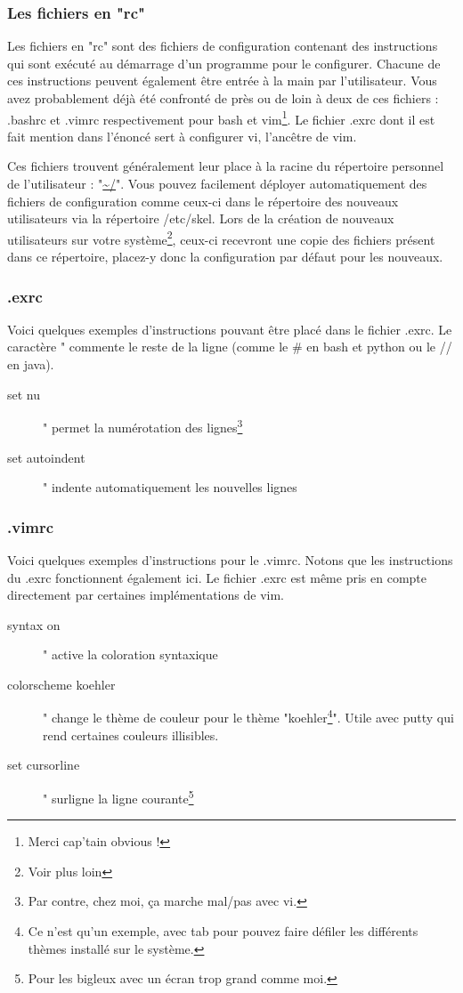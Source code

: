 \documentclass[a4paper,11pt]{article}
\begin{document}
\subsubsection{Les fichiers en "rc"}
\par Les fichiers en "rc" sont des fichiers de configuration contenant des instructions qui sont exécuté au démarrage d'un programme pour le configurer. Chacune de ces instructions peuvent également être entrée à la main par l'utilisateur. Vous avez probablement déjà été confronté de près ou de loin à deux de ces fichiers : .bashrc et .vimrc respectivement pour bash et vim\footnote{Merci cap'tain obvious !}. Le fichier .exrc dont il est fait mention dans l'énoncé sert à configurer vi, l'ancêtre de vim.
\par Ces fichiers trouvent généralement leur place à la racine du répertoire personnel de l'utilisateur : "\url{~/}". Vous pouvez facilement déployer automatiquement des fichiers de configuration comme ceux-ci dans le répertoire des nouveaux utilisateurs via la répertoire /etc/skel. Lors de la création de nouveaux utilisateurs sur votre système\footnote{Voir plus loin}, ceux-ci recevront une copie des fichiers présent dans ce répertoire, placez-y donc la configuration par défaut pour les nouveaux.

\subsubsection{.exrc}
\par Voici quelques exemples d'instructions pouvant être placé dans le fichier .exrc. Le caractère " commente le reste de la ligne (comme le \# en bash et python ou le // en java).
\begin{description}
  \item[set nu] " permet la numérotation des lignes\footnote{Par contre, chez moi, ça marche mal/pas avec vi.}
  \item[set autoindent] " indente automatiquement les nouvelles lignes
\end{description}

\subsubsection{.vimrc}
\par Voici quelques exemples d'instructions pour le .vimrc. Notons que les instructions du .exrc fonctionnent également ici. Le fichier .exrc est même pris en compte directement par certaines implémentations de vim.
\begin{description}
  \item[syntax on] " active la coloration syntaxique 
  \item[colorscheme koehler] " change le thème de couleur pour le thème "koehler\footnote{Ce n'est qu'un exemple, avec tab pour pouvez faire défiler les différents thèmes installé sur le système.}". Utile avec putty qui rend certaines couleurs illisibles.
  \item[set cursorline] " surligne la ligne courante\footnote{Pour les bigleux avec un écran trop grand comme moi.}
\end{description}
\end{document}
